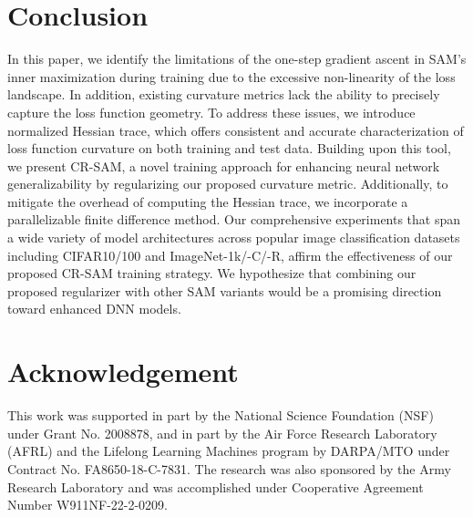 \documentclass[letterpaper]{article} %
\theoremstyle{plain}
\theoremstyle{definition}
\begin{document}

\section{Conclusion}
\label{sec:conclusion}
In this paper, we identify the limitations of the one-step gradient ascent in SAM's inner maximization during training due to the excessive non-linearity of the loss landscape. In addition, existing curvature metrics lack the ability to precisely capture the loss function geometry. To address these issues, we introduce normalized Hessian trace, which offers consistent and accurate characterization of loss function curvature on both training and test data. Building upon this tool, we present CR-SAM, a novel training approach for enhancing neural network generalizability by regularizing our proposed curvature metric. Additionally, to mitigate the overhead of computing the Hessian trace, we incorporate a parallelizable finite difference method. Our comprehensive experiments that span a wide variety of model architectures across popular image classification datasets including CIFAR10/100 and ImageNet-1k/-C/-R, affirm the effectiveness of our proposed CR-SAM training strategy. We hypothesize that combining our proposed regularizer with other SAM variants would be a promising direction toward enhanced DNN models.

\section{Acknowledgement}
This work was supported in part by the National Science Foundation (NSF) under Grant No. 2008878, and in part by the Air Force Research Laboratory (AFRL) and the Lifelong Learning Machines program by DARPA/MTO under Contract No. FA8650-18-C-7831. %
The research was also sponsored by the Army Research Laboratory and was accomplished under Cooperative Agreement Number W911NF-22-2-0209. %
\end{document}
